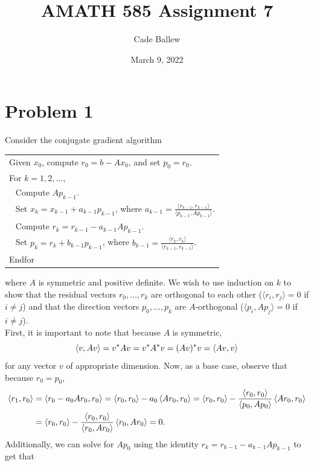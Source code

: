 \documentclass{article}
\title{AMATH 585 Assignment 7}
\author{Cade Ballew}
\date{March 9, 2022}
\begin{document}
	
\maketitle
	
\section{Problem 1}
Consider the conjugate gradient algorithm 
\vspace{.1in}

\begin{center}
\begin{tabular}{|l|} \hline
Given $x_0$, compute $r_0 = b - A x_0$, and set $p_0 = r_0$. \\
For $k=1,2, \ldots$, \\
$~~$ Compute $A p_{k-1}$. \\
$~~$ Set $x_k = x_{k-1} + a_{k-1} p_{k-1}$, where $a_{k-1} = \frac{\langle r_{k-1} , r_{k-1} \rangle}
{\langle p_{k-1} , A p_{k-1} \rangle}$. \\
$~~$ Compute $r_k = r_{k-1} - a_{k-1} A p_{k-1}$. \\
$~~$ Set $p_k = r_k + b_{k-1} p_{k-1}$, where $b_{k-1} = \frac{\langle r_k , r_k \rangle}
{\langle r_{k-1} , r_{k-1} \rangle}$. \\
Endfor \\ \hline
\end{tabular}
\end{center}
\vspace{.1in}
where $A$ is symmetric and positive definite. We wish to use induction on $k$ to show that the residual vectors $r_0 , \ldots , r_k$ are orthogonal to each other
($\langle r_i , r_j \rangle = 0$ if $i \neq j$) and that the direction vectors 
$p_0 , \ldots , p_k$ are $A$-orthogonal ($\langle p_i , A p_j \rangle = 0$ if $i \neq j$).\\
First, it is important to note that because $A$ is symmetric,
\[
\left \langle v , Av \right \rangle=v^*Av=v^*A^*v=(Av)^*v=\left \langle Av , v \right \rangle
\]
for any vector $v$ of appropriate dimension. Now, as a base case, observe that because $r_0=p_0$, 
\begin{align*}
\left \langle r_1 , r_0 \right \rangle&=\left \langle r_0-a_0Ar_0 , r_0 \right \rangle=\left \langle r_0 , r_0 \right \rangle-a_0\left \langle Ar_0 , r_0 \right \rangle=\left \langle r_0 , r_0 \right \rangle-\frac{\left \langle r_0 , r_0 \right \rangle}{\left \langle p_0 , Ap_0 \right \rangle}\left \langle Ar_0 , r_0 \right \rangle\\&=\left \langle r_0 , r_0 \right \rangle-\frac{\left \langle r_0 , r_0 \right \rangle}{\left \langle r_0 , Ar_0 \right \rangle}\left \langle r_0 , Ar_0 \right \rangle=0.
\end{align*}
Additionally, we can solve for $Ap_0$ using the identity $r_k = r_{k-1} - a_{k-1} A p_{k-1}$ to get that
\end{document}
